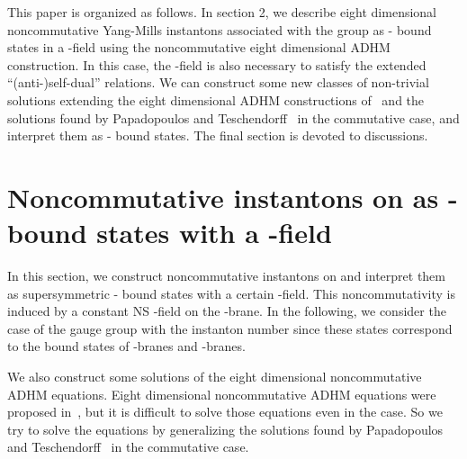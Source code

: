 \documentclass[a4paper,12pt]{article}
\begin{document}
This paper is organized as follows. 
In section 2, we describe eight dimensional noncommutative 
Yang-Mills instantons associated with the group \coordHE{} 
as \coordHE{}-\coordHE{} bound states in a \coordHE{}-field
using the noncommutative eight dimensional ADHM construction. 
In this case, the \coordHE{}-field is also necessary to satisfy the extended 
``(anti-)self-dual'' relations.
We can construct some new classes of non-trivial solutions 
extending the eight dimensional ADHM constructions of~\cite{cgk} 
and the solutions found by Papadopoulos and Teschendorff~\cite{pt} 
in the commutative case, 
and interpret them as \coordHE{}-\coordHE{} bound states.
The final section is devoted to discussions.







\section{Noncommutative instantons on \coordHE{} 
as \coordHE{}-\coordHE{} bound states with a \coordHE{}-field}

In this section, we construct noncommutative instantons on \coordHE{} 
 and interpret them as supersymmetric \coordHE{}-\coordHE{} bound states
 with a certain  \coordHE{}-field.
This noncommutativity is induced by a constant NS \coordHE{}-field 
on the \coordHE{}-brane.
In the following, we consider the case of the gauge group \coordHE{} with 
the instanton number \coordHE{} since these states correspond to the 
bound states of \coordHE{}  \coordHE{}-branes and \coordHE{}  \coordHE{}-branes.

We also construct some solutions of the eight dimensional 
noncommutative ADHM equations.
Eight dimensional noncommutative ADHM equations were proposed in~\cite{ohta}, 
but it is difficult to solve those equations even in the \coordHE{} case.
So we try to solve the equations 
by generalizing the solutions found by Papadopoulos 
and Teschendorff~\cite{pt, pt2} in the commutative case.
\end{document}
